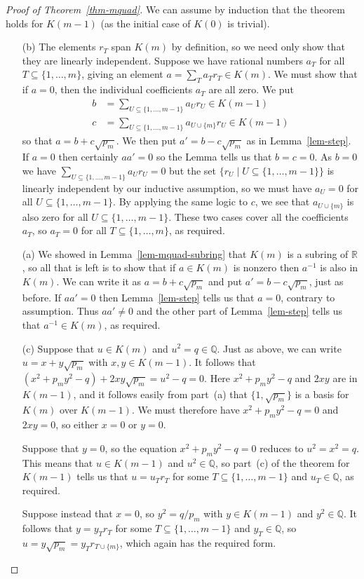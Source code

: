 \documentclass{amsart}
\newcommand{\Q}         {{\mathbb{Q}}}
\newcommand{\R}         {{\mathbb{R}}}
\newcommand{\st}        {\;|\;}
\newcommand{\sse}       {\subseteq}
\renewcommand{\:}{\colon}
\theoremstyle{definition}
\begin{document}
\begin{proof}[Proof of Theorem~\ref{thm-mquad}]
 We can assume by induction that the theorem holds for $K(m-1)$ (as
 the initial case of $K(0)$ is trivial).  

 \begin{itemize}
  \item[(b)] The elements $r_T$ span $K(m)$ by definition, so we need
   only show that they are linearly independent.  Suppose we have
   rational numbers $a_T$ for all $T\sse\{1,\dotsc,m\}$, giving an
   element $a=\sum_Ta_Tr_T\in K(m)$.  We must show that if $a=0$, then
   the individual coefficients $a_T$ are all zero.  We put 
   \begin{align*}
    b &= \sum_{U\sse\{1,\dotsc,m-1\}} a_Ur_U \in K(m-1) \\
    c &= \sum_{U\sse\{1,\dotsc,m-1\}} a_{U\cup\{m\}}r_U \in K(m-1)
   \end{align*}
   so that $a=b+c\sqrt{p_m}$.  We then put $a'=b-c\sqrt{p_m}$ as in
   Lemma~\ref{lem-step}.  If $a=0$ then certainly $aa'=0$ so the Lemma
   tells us that $b=c=0$.  As $b=0$ we have
   $\sum_{U\sse\{1,\dotsc,m-1\}}a_Ur_U=0$ but the set $\{r_U\st
   U\sse\{1,\dotsc,m-1\}\}$ is linearly independent by our inductive
   assumption, so we must have $a_U=0$ for all
   $U\sse\{1,\dotsc,m-1\}$.  By applying the same logic to $c$, we see
   that $a_{U\cup\{m\}}$ is also zero for all
   $U\sse\{1,\dotsc,m-1\}$.  These two cases cover all the
   coefficients $a_T$, so $a_T=0$ for all $T\sse\{1,\dotsc,m\}$, as
   required.
  \item[(a)] We showed in Lemma~\ref{lem-mquad-subring} that $K(m)$ is a
   subring of $\R$, so all that is left is to show that if $a\in K(m)$
   is nonzero then $a^{-1}$ is also in $K(m)$.  We can write it as
   $a=b+c\sqrt{p_m}$ and put $a'=b-c\sqrt{p_m}$, just as before.  If
   $aa'=0$ then Lemma~\ref{lem-step} tells us that $a=0$, contrary to
   assumption.  Thus $aa'\neq 0$ and the other part of
   Lemma~\ref{lem-step} tells us that $a^{-1}\in K(m)$, as required.
  \item[(c)] Suppose that $u\in K(m)$ and $u^2=q\in\Q$.  Just as above,
   we can write $u=x+y\sqrt{p_m}$ with $x,y\in K(m-1)$.  It follows
   that $(x^2+p_my^2-q)+2xy\sqrt{p_m}=u^2-q=0$.  Here $x^2+p_my^2-q$
   and $2xy$ are in $K(m-1)$, and it follows easily from part~(a) that
   $\{1,\sqrt{p_m}\}$ is a basis for $K(m)$ over $K(m-1)$.  We must
   therefore have $x^2+p_my^2-q=0$ and $2xy=0$, so either $x=0$ or
   $y=0$. 

   Suppose that $y=0$, so the equation $x^2+p_my^2-q=0$ reduces to
   $u^2=x^2=q$.  This means that $u\in K(m-1)$ and $u^2\in\Q$, so
   part~(c) of the theorem for $K(m-1)$ tells us that $u=u_Tr_T$ for
   some $T\sse\{1,\dotsc,m-1\}$ and $u_T\in\Q$, as required.

   Suppose instead that $x=0$, so $y^2=q/p_m$ with $y\in K(m-1)$ and
   $y^2\in\Q$.  It follows that $y=y_Tr_T$ for some
   $T\sse\{1,\dotsc,m-1\}$ and $y_T\in\Q$, so
   $u=y\sqrt{p_m}=y_Tr_{T\cup\{m\}}$, which again has the required form. 
 \end{itemize}
\end{proof}
\end{document}
